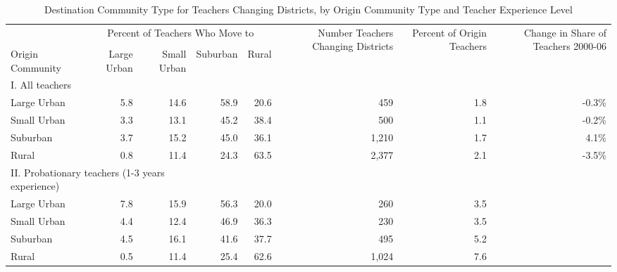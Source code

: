 \documentclass[]{article}
\begin{document}
\begin{sidewaystable}[ht]
\centering
\begin{tabular}{lrrrrrrr}
  \hline
 & \multicolumn{4}{c}{\multirow{2}{*}{Percent of Teachers Who Move to}} & \multirow{4}{*}{\parbox{0.09\linewidth}{Number Teachers Changing Districts}} & \multirow{4}{*}{\parbox{0.07\linewidth}{Percent of Origin Teachers}} & \multirow{4}{*}{\parbox{0.07\linewidth}{Change in Share of Teachers 2000-06}}\\
 & \multicolumn{4}{c}{} & & & \\ \cline{2-5}
& & & & & & & \\
Origin Community & Large Urban & Small Urban & Suburban & Rural &  &  &  \\ 
  \hline
I. All teachers & & & & & & & \\
\quad Large Urban & 5.8 & 14.6 & 58.9 & 20.6 & 459 & 1.8 & -0.3\% \\ 
  \quad Small Urban & 3.3 & 13.1 & 45.2 & 38.4 & 500 & 1.1 & -0.2\% \\ 
  \quad Suburban & 3.7 & 15.2 & 45.0 & 36.1 & 1,210 & 1.7 & 4.1\% \\ 
  \quad Rural & 0.8 & 11.4 & 24.3 & 63.5 & 2,377 & 2.1 & -3.5\% \\ 
\multicolumn{3}{l}{II. Probationary teachers (1-3 years experience)} & & & & & \\
  \quad Large Urban & 7.8 & 15.9 & 56.3 & 20.0 & 260 & 3.5 &  \\ 
  \quad Small Urban & 4.4 & 12.4 & 46.9 & 36.3 & 230 & 3.5 &  \\ 
  \quad Suburban & 4.5 & 16.1 & 41.6 & 37.7 & 495 & 5.2 &  \\ 
  \quad Rural & 0.5 & 11.4 & 25.4 & 62.6 & 1,024 & 7.6 &  \\ 
   \hline
\end{tabular}
\caption{Destination Community Type for Teachers Changing Districts, by Origin Community Type and Teacher Experience Level} 
\label{tbl:markov}
\end{sidewaystable}
\end{document}
